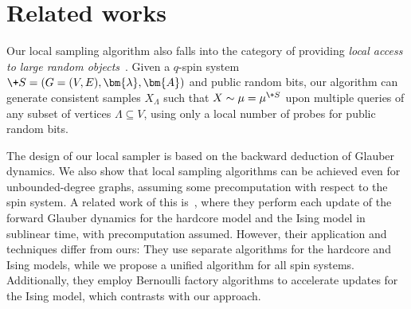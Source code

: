 \section{Related works}

Our local sampling algorithm also falls into the category of providing \emph{local access to large random objects}~\cite{amartya2020local,biswas2022local,morters2022sublinear}.
Given a $q$-spin system $\+S = (G = (V, E), \bm{\lambda}, \bm{A})$ and public random bits, our algorithm can generate consistent samples $X_{\Lambda}$ such that $X \sim \mu = \mu^{\+S}$ upon multiple queries of any subset of vertices $\Lambda \subseteq V$, using only a local number of probes for public random bits.

The design of our local sampler is based on the backward deduction of Glauber dynamics. We also show that local sampling algorithms can be achieved even for unbounded-degree graphs, assuming some precomputation with respect to the spin system. A related work of this is~\cite{anari2022entropic}, where they perform each update of the forward Glauber dynamics for the hardcore model and the Ising model in sublinear time, with precomputation assumed. However, their application and techniques differ from ours: They use separate algorithms for the hardcore and Ising models, while we propose a unified algorithm for all spin systems. Additionally, they employ Bernoulli factory algorithms to accelerate updates for the Ising model, which contrasts with our approach.